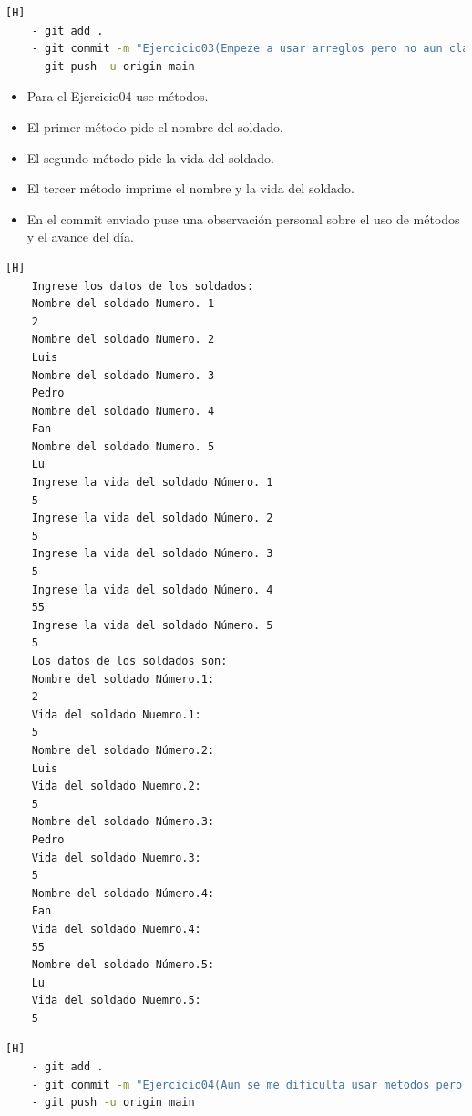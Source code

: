 \documentclass{article}
\begin{document}
\clearpage

\begin{lstlisting}[language=bash,caption={Commit: Ejercicio03(Empeze a usar arreglos pero no aun clases)}][H]
	- git add .
	- git commit -m "Ejercicio03(Empeze a usar arreglos pero no aun clases)"			
	- git push -u origin main
\end{lstlisting}


\begin{itemize}
	\item Para el Ejercicio04 use métodos.
	\item El primer método pide el nombre del soldado.
	\item El segundo método pide la vida del soldado.
	\item El tercer método imprime el nombre y la vida del soldado.
	\item En el commit enviado puse una observación personal sobre el uso de métodos y el avance del día.
\end{itemize}
\begin{lstlisting}[language=bash,caption={Ejecución del Ejercicio04}][H]
	Ingrese los datos de los soldados: 
	Nombre del soldado Numero. 1
	2
	Nombre del soldado Numero. 2
	Luis
	Nombre del soldado Numero. 3
	Pedro
	Nombre del soldado Numero. 4
	Fan
	Nombre del soldado Numero. 5
	Lu
	Ingrese la vida del soldado Número. 1
	5
	Ingrese la vida del soldado Número. 2
	5
	Ingrese la vida del soldado Número. 3
	5
	Ingrese la vida del soldado Número. 4
	55
	Ingrese la vida del soldado Número. 5
	5
	Los datos de los soldados son: 
	Nombre del soldado Número.1:
	2
	Vida del soldado Nuemro.1:
	5
	Nombre del soldado Número.2:
	Luis
	Vida del soldado Nuemro.2:
	5
	Nombre del soldado Número.3:
	Pedro
	Vida del soldado Nuemro.3:
	5
	Nombre del soldado Número.4:
	Fan
	Vida del soldado Nuemro.4:
	55
	Nombre del soldado Número.5:
	Lu
	Vida del soldado Nuemro.5:
	5
\end{lstlisting}

\begin{lstlisting}[language=bash,caption={Commit: Ejercicio04(Aun se me dificulta usar metodos pero esta vez pude utilizarlos, aun no use arreglo de objetos, cree intento.java para verificar si esta bien la clase intento(aun no entiendo bien como se hace y el porque))}][H]
	- git add .
	- git commit -m "Ejercicio04(Aun se me dificulta usar metodos pero esta vez pude utilizarlos, aun no use arreglo de objetos, cree intento.java para verificar si esta bien la clase intento(aun no entiendo bien como se hace y el porque))"			
	- git push -u origin main
\end{lstlisting}
	
\end{document}
